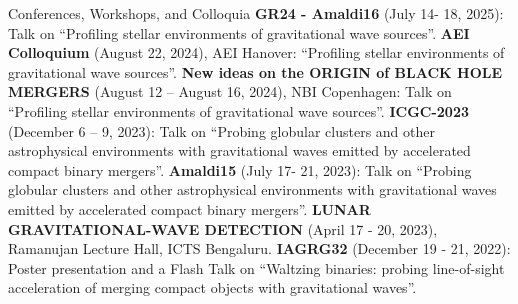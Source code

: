 \begin{rubric}{Conferences, Workshops, and Colloquia}
\entry*[] \textbf{GR24 - Amaldi16} (July 14- 18, 2025): Talk on ``Profiling stellar environments of gravitational wave sources''.
%
\entry*[] \textbf{AEI Colloquium} (August 22, 2024), AEI Hanover: ``Profiling stellar environments of gravitational wave sources''.
%
\entry*[] \textbf{New ideas on the ORIGIN of BLACK HOLE MERGERS} (August 12 – August 16, 2024), NBI Copenhagen: Talk on ``Profiling stellar environments of gravitational wave sources''.
%
\entry*[] \textbf{ICGC-2023} (December 6 – 9, 2023): Talk on ``Probing globular clusters and other astrophysical environments with gravitational waves emitted by accelerated compact binary mergers''.
%
\entry*[] \textbf{Amaldi15} (July 17- 21, 2023): Talk on ``Probing globular clusters and other astrophysical environments with gravitational waves emitted by accelerated compact binary mergers''.
%
\entry*[] \textbf{LUNAR GRAVITATIONAL-WAVE DETECTION} (April 17 - 20, 2023), Ramanujan Lecture Hall, ICTS Bengaluru.
%
\entry*[] \textbf{IAGRG32} (December 19 - 21, 2022): Poster presentation and a Flash Talk on ``Waltzing binaries: probing line-of-sight acceleration of merging compact objects with gravitational waves''.
%

\end{rubric}
